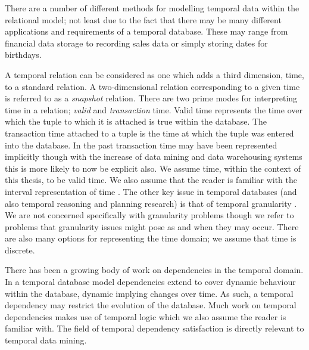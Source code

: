 There are a number of different methods for modelling temporal data
within the relational model; not least due to the fact that there may be
many different applications and requirements of a temporal
database. These may range from financial data storage to recording
sales data or simply storing dates for birthdays. 

\medskip

A temporal
relation can be considered as one which adds a third dimension, time,
to a standard relation. A two-dimensional relation corresponding to a
given time is 
referred to as a {\em snapshot} relation.
There are two prime modes for interpreting time in a relation; {\em
valid} and {\em transaction} time. Valid time represents the time over
which the tuple to which it is attached is true within the
database. The transaction time attached to a tuple is the time at
which  the tuple was entered into the database. In the past
transaction time may
have been represented implicitly though with the increase of data
mining and data warehousing systems this is more likely to now be
explicit also.  We assume
time, within the context of this thesis, to be valid time. We also
assume that the reader is familiar with the interval representation of
time \cite{all84}. The other key issue in temporal databases (and also
temporal reasoning and planning research) is that of temporal
granularity \cite{bwj96}. We are not concerned specifically with
granularity problems though we refer to problems that granularity
issues might pose as and when they may occur. There are also many
options for representing the time domain; we assume that time is discrete.

\medskip

There has been a growing body of work on dependencies in the temporal
domain. In a temporal database model dependencies extend to cover
dynamic behaviour within the database, dynamic implying changes over
time.  As such, a temporal dependency may
restrict the evolution of the database. Much work on temporal
dependencies makes use of temporal logic \cite{eme90,mp92} which we
also 
assume the reader is familiar with. The field of temporal dependency
satisfaction is directly relevant to temporal data mining. 


